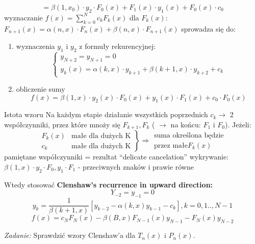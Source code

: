 \begin{frame}
	$$=\beta(1,x_0) \cdot y_2 \cdot F_0(x)+F_1(x) \cdot y_1(x) +F_0(x) \cdot c_0 $$
    wyznaczanie $f(x) = \sum_{k=0}^{N}c_kF_k(x)$ \newline
    dla $F_k(x)$: $F_{n+1}(x) = \alpha(n,x) \cdot F_n(x) + \beta(n,x) \cdot F_{n+1}(x)$ \newline
    sprowadza się do:
    \begin{enumerate}
    \item wyznaczenia $y_1$ i $y_2$ z formuły rekurencyjnej: \newline
    	$$\left\{\begin{array}{l}
    	y_{N+2} = y_{N+1} = 0 \\
        y_k(x) = \alpha(k,x) \cdot y_{k+1} + \beta(k+1,x) \cdot y_{k+2} +c_k
    	\end{array}\right.$$
     \item obliczenie sumy \newline
     $$f(x) = \beta(1,x) \cdot y_2(x) \cdot F_0(x) + y_1(x) \cdot F_1(x) + c_0 \cdot F_0(x)$$
    \end{enumerate}
\end{frame}
\begin{frame}{Istota wzoru}
	Na każdym etapie działanie wszystkich poprzednich $c_k \rightarrow$ 2 współczynniki, przez które mnoży się $F_{k+1},F_k$ ( $\rightarrow$ na końcu: $F_1$ i $F_0$).\newline
    Jeżeli:
    $$\left.\begin{array}{cl}
    	F_k(x) & \text{małe dla dużych K} \\
        c_k & \text{małe dla dużych K}
    \end{array}\right\} \Rightarrow\left.\begin{array}{c}
    	 \text{suma określona będzie} \\
         \text{przez małe} F_k(x)
    \end{array}\right.$$
    pamiętane współczynniki = rezultat ``delicate cancelation'' \newline
    wykrywanie: $\beta(1,x) \cdot y_2 \cdot F_0,y_1 \cdot F_1$ - przeciwnych znaków i prawie równe
\end{frame}
\begin{frame}
	Wtedy stosować \textbf{Clenshaw's recurrence in upward direction:}
    $$Y_{-2} = y_{-1} = 0$$
    $$y_k = \frac{1}{\beta(k+1,x)}[y_{k-2}-\alpha(k,x)y_{k-1} - c_k], k=0,1..,N-1$$
    $$f(x) = c_NF_N(x) - \beta(B,x)F_{N-1}(x)y_{N-1} - F_N(x)y_{N-2}$$
    \begin{flushright}
    	\textit{Zadanie: } \quad Sprawdzić wzory Clenshaw'a dla $T_n(x)$ i $P_n(x)$.
    \end{flushright}
\end{frame}
